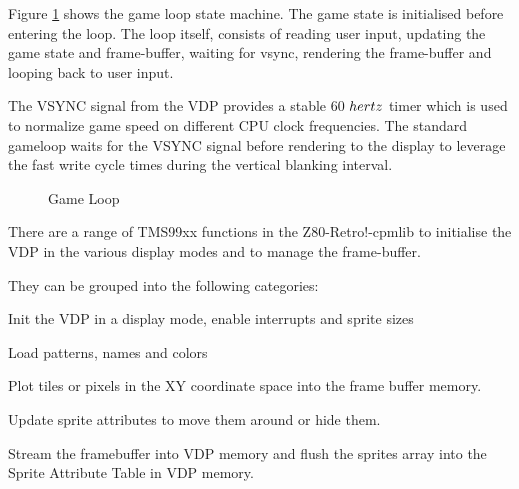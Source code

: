 \documentclass[10pt,a4paper,hidelinks]{article}
\def\lib{Z80-Retro!-cpmlib }
\begin{document}
Figure \ref{fig:gameloop} shows the game loop state machine.  The game state is
initialised before entering the loop.  The loop itself, consists of reading user
input, updating the game state and frame-buffer, waiting for vsync, rendering
the frame-buffer and looping back to user input.

The VSYNC signal from the VDP provides a stable 60 ${\\hertz}$ timer which is
used to normalize game speed on different CPU clock frequencies.  The standard
gameloop waits for the VSYNC signal before rendering to the display to leverage
the fast write cycle times during the vertical blanking interval.

\begin{figure}[H]
  \begin{center}
  \end{center}
  \caption{Game Loop}
\label{fig:gameloop}
\end{figure}

There are a range of TMS99xx functions in the \lib to initialise the VDP in the
various display modes and to manage the frame-buffer.

They can be grouped into the following categories:

\begin{description}[font=$\bullet$~\normalfont\scshape\color{red!50!black}]
  \item[Initialization]
    Init the VDP in a display mode, enable interrupts and
    sprite sizes
  \item[Loading data]
    Load patterns, names and colors
  \item[Plotting to the frame buffer]
    Plot tiles or pixels in the XY coordinate
    space into the frame buffer memory.
  \item[Sprites]
    Update sprite attributes to move them around or hide them.
  \item[Flushing the frame buffer to the video memory]
    Stream the framebuffer
    into VDP memory and flush the sprites array into the Sprite Attribute Table in
    VDP memory.
\end{description}
\end{document}
